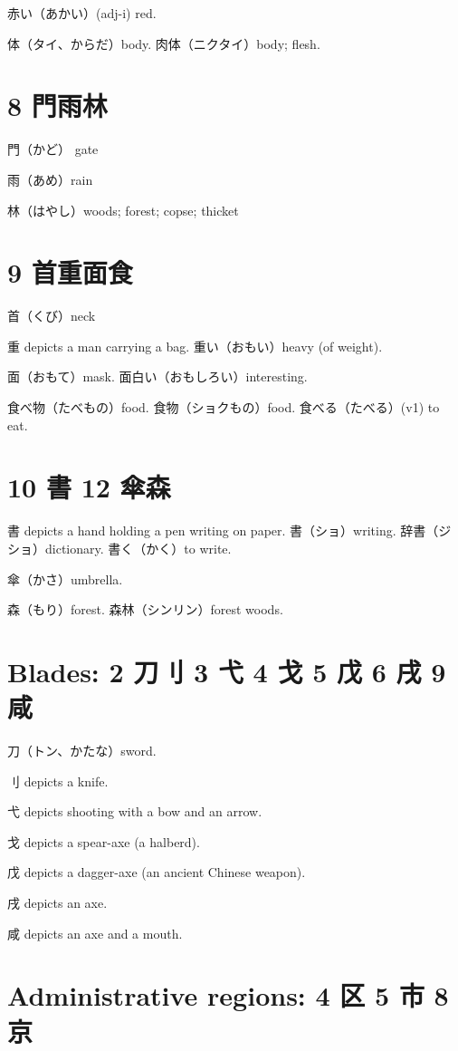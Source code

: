 赤い（あかい）(adj-i) red.

体（タイ、からだ）body.
肉体（ニクタイ）body; flesh.

\section{8 門雨林}

門（かど） gate

雨（あめ）rain

林（はやし）woods; forest; copse; thicket

\section{9 首重面食}

首（くび）neck

重 depicts a man carrying a bag.
重い（おもい）heavy (of weight).

面（おもて）mask.
面白い（おもしろい）interesting.

食べ物（たべもの）food.
食物（ショクもの）food.
食べる（たべる）(v1) to eat.

\section{10 書 12 傘森}

書 depicts a hand holding a pen writing on paper.
書（ショ）writing.
辞書（ジショ）dictionary.
書く（かく）to write.

傘（かさ）umbrella.

森（もり）forest.
森林（シンリン）forest woods.

\section{Blades: 2 刀刂 3 弋 4 戈 5 戊 6 戌 9 咸}

刀（トン、かたな）sword.

刂 depicts a knife.

弋 depicts shooting with a bow and an arrow.

戈 depicts a spear-axe (a halberd).

戊 depicts a dagger-axe (an ancient Chinese weapon).

戌 depicts an axe.

咸 depicts an axe and a mouth.

\section{Administrative regions: 4 区 5 市 8 京}

